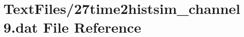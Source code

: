 \hypertarget{27time2histsim__channel9_8dat}{}\section{Text\+Files/27time2histsim\+\_\+channel9.dat File Reference}
\label{27time2histsim__channel9_8dat}
